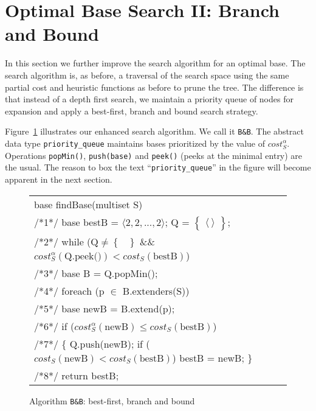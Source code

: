 \documentclass[envcountsame]{llncs}
\newcommand\tuple[1]{\langle #1 \rangle}
\newcommand{\cost}{\mathit{cost}}
\newenvironment{SProg}
     {\begin{small}\begin{tt}\begin{tabular}[c]{l}}{\end{tabular}\end{tt}\end{small}}
\newcommand{\qin}{\hspace*{0.15in}}
\newcommand{\set}[1]{\left\{
      \begin{array}{l}#1\end{array}
        \right\}}
\begin{document}
\section{Optimal Base Search II: Branch and Bound}
\label{sec:ob2}

In this section we further improve the search algorithm for an optimal
base. 
The search algorithm is, as before, a traversal of the search space
using the same partial cost and heuristic functions as before to prune
the tree. The difference is that instead of a depth first search, we
maintain a priority queue of nodes for expansion and apply a
best-first, branch and bound search strategy.


Figure~\ref{fig:alg2} illustrates our enhanced search algorithm. We
call it \texttt{B\&B}.
The abstract data type \texttt{priority\_queue} maintains bases
prioritized by the value of $\cost^\alpha_S$. Operations
\texttt{popMin()}, \texttt{push(base)} and \texttt{peek()} (peeks at
the minimal entry) are the usual. The reason to box the text
``\texttt{priority\_queue}'' in the figure will become apparent in
the next section.



\begin{figure}[t]
  \begin{SProg}
  base findBase(multiset S)\\
  {\scriptsize /*1*/} \qin base  bestB = $\tuple{2,2,...,2}$; 
                           \fbox{priority\_queue} Q = $\set{\tuple{~}}$;\\
  {\scriptsize /*2*/} \qin while ($\mbox{Q} \neq \set{}$ \mbox{\&\&} 
        $\cost^\alpha_S(\mbox{Q.peek()}) < \cost_S(\mbox{bestB})$) \\
  {\scriptsize /*3*/} \qin\qin  base B = Q.popMin();\\
  {\scriptsize /*4*/} \qin\qin  foreach (p $\in$ B.extenders(S)) \\
  {\scriptsize /*5*/} \qin\qin\qin base newB = B.extend(p);\\
  {\scriptsize /*6*/} \qin\qin\qin  if ($\cost^\alpha_S(\mbox{newB})
                                         \leq \cost_S(\mbox{bestB})$) \\
  {\scriptsize /*7*/} \qin\qin\qin\qin  \{ Q.push(newB); 			
        if ($\cost_S(\mbox{newB})<\cost_S(\mbox{bestB})$) bestB =
        newB; \}\\ 
  {\scriptsize /*8*/} \qin return bestB;\\
\end{SProg}
\caption{Algorithm \texttt{B\&B}: best-first, branch and bound}
\label{fig:alg2}
\vspace{-3ex}
\end{figure}
\end{document}
